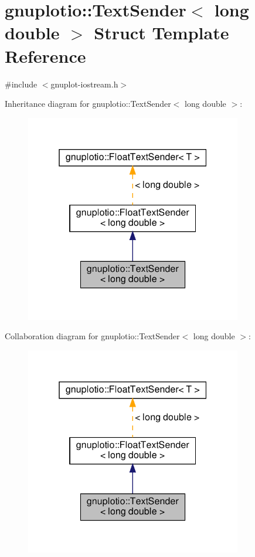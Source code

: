 \hypertarget{structgnuplotio_1_1_text_sender_3_01long_01double_01_4}{}\section{gnuplotio\+:\+:Text\+Sender$<$ long double $>$ Struct Template Reference}
\label{structgnuplotio_1_1_text_sender_3_01long_01double_01_4}


{\ttfamily \#include $<$gnuplot-\/iostream.\+h$>$}



Inheritance diagram for gnuplotio\+:\+:Text\+Sender$<$ long double $>$\+:
\nopagebreak
\begin{figure}[H]
\begin{center}
\leavevmode
\includegraphics[width=268pt]{structgnuplotio_1_1_text_sender_3_01long_01double_01_4__inherit__graph}
\end{center}
\end{figure}


Collaboration diagram for gnuplotio\+:\+:Text\+Sender$<$ long double $>$\+:
\nopagebreak
\begin{figure}[H]
\begin{center}
\leavevmode
\includegraphics[width=268pt]{structgnuplotio_1_1_text_sender_3_01long_01double_01_4__coll__graph}
\end{center}
\end{figure}
